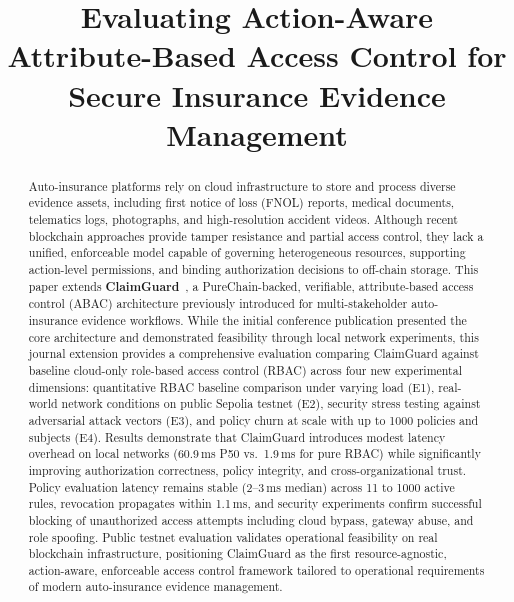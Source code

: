 \documentclass[final,5p,times,twocolumn]{elsarticle}
\begin{document}
\begin{frontmatter}

	\title{Evaluating Action-Aware Attribute-Based Access Control for Secure Insurance Evidence Management}



	\begin{abstract}
		Auto-insurance platforms rely on cloud infrastructure to store and process diverse evidence assets, including first notice of loss (FNOL) reports, medical documents, telematics logs, photographs, and high-resolution accident videos. Although recent blockchain approaches provide tamper resistance and partial access control, they lack a unified, enforceable model capable of governing heterogeneous resources, supporting action-level permissions, and binding authorization decisions to off-chain storage. This paper extends \textbf{ClaimGuard}~\cite{eneh2025claimguard}, a PureChain-backed, verifiable, attribute-based access control (ABAC) architecture previously introduced for multi-stakeholder auto-insurance evidence workflows. While the initial conference publication presented the core architecture and demonstrated feasibility through local network experiments, this journal extension provides a comprehensive evaluation comparing ClaimGuard against baseline cloud-only role-based access control (RBAC) across four new experimental dimensions: quantitative RBAC baseline comparison under varying load (E1), real-world network conditions on public Sepolia testnet (E2), security stress testing against adversarial attack vectors (E3), and policy churn at scale with up to 1000 policies and subjects (E4). Results demonstrate that ClaimGuard introduces modest latency overhead on local networks (60.9\,ms P50 vs.\ 1.9\,ms for pure RBAC) while significantly improving authorization correctness, policy integrity, and cross-organizational trust. Policy evaluation latency remains stable (2--3\,ms median) across 11 to 1000 active rules, revocation propagates within 1.1\,ms, and security experiments confirm successful blocking of unauthorized access attempts including cloud bypass, gateway abuse, and role spoofing. Public testnet evaluation validates operational feasibility on real blockchain infrastructure, positioning ClaimGuard as the first resource-agnostic, action-aware, enforceable access control framework tailored to operational requirements of modern auto-insurance evidence management.
	\end{abstract}


\end{frontmatter}
\end{document}
